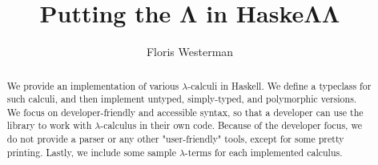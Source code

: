 \documentclass[a4paper,10pt]{article}
\title{Putting the Λ in HaskeΛΛ}
\author{Floris Westerman}
\begin{document}
\maketitle

\begin{abstract}
We provide an implementation of various $λ$-calculi in Haskell. We define a typeclass for such calculi, and then implement untyped, simply-typed, and polymorphic versions. We focus on developer-friendly and accessible syntax, so that a developer can use the library to work with $λ$-calculus in their own code. Because of the developer focus, we do not provide a parser or any other "user-friendly" tools, except for some pretty printing. Lastly, we include some sample $λ$-terms for each implemented calculus.
\end{abstract}

\vfill

\tableofcontents

\clearpage

\clearpage


\clearpage


\clearpage


\end{document}
